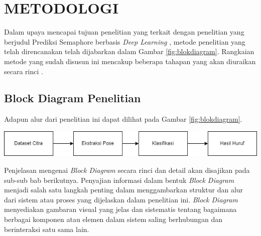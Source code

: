 \chapter{METODOLOGI}


Dalam upaya mencapai tujuan penelitian yang terkait dengan penelitian yang berjudul Prediksi Semaphore berbasis \textit{Deep Learning }, metode penelitian yang telah direncanakan telah dijabarkan dalam Gambar \ref{fig:blokdiagram}. Rangkaian metode yang sudah disusun ini mencakup beberapa tahapan yang akan diuraikan secara rinci .

\section{Block Diagram Penelitian}
Adapun alur dari penelitian ini dapat dilihat pada Gambar \ref{fig:blokdiagram}.
\begin{center}
	\includegraphics[width=1.0\linewidth]{gambar/metodologi_kerja.png}
	\label{fig:blokdiagram}
\end{center}
Penjelasan mengenai \textit{Block Diagram} secara rinci dan detail akan disajikan pada sub-sub bab berikutnya. Penyajian informasi dalam bentuk \textit{Block Diagram} menjadi salah satu langkah penting dalam menggambarkan struktur dan alur dari sistem atau proses yang dijelaskan dalam penelitian ini. \textit{Block Diagram} menyediakan gambaran visual yang jelas dan sistematis tentang bagaimana berbagai komponen atau elemen dalam sistem saling berhubungan dan berinteraksi satu sama lain.

